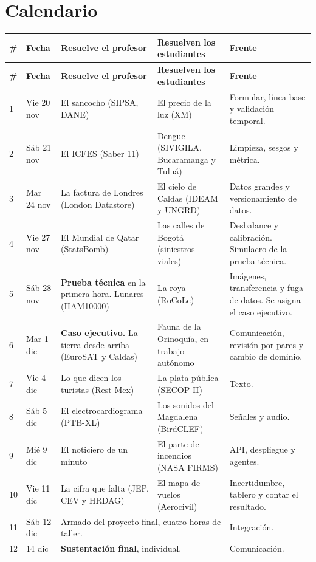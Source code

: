 \documentclass[12pt,letterpaper]{article}
\begin{document}
\section{Calendario}
\begin{longtable}{p{0.5cm}p{1.6cm}p{4.1cm}p{4.1cm}p{3.9cm}}
\toprule
\textbf{\#} & \textbf{Fecha} & \textbf{Resuelve el profesor} & \textbf{Resuelven los estudiantes} & \textbf{Frente}\\
\midrule
\endfirsthead
\toprule
\textbf{\#} & \textbf{Fecha} & \textbf{Resuelve el profesor} & \textbf{Resuelven los estudiantes} & \textbf{Frente}\\
\midrule
\endhead
1 & Vie 20 nov & El sancocho (SIPSA, DANE) & El precio de la luz (XM) & Formular, línea base y validación temporal.\\
2 & Sáb 21 nov & El ICFES (Saber 11) & Dengue (SIVIGILA, Bucaramanga y Tuluá) & Limpieza, sesgos y métrica.\\
3 & Mar 24 nov & La factura de Londres (London Datastore) & El cielo de Caldas (IDEAM y UNGRD) & Datos grandes y versionamiento de datos.\\
4 & Vie 27 nov & El Mundial de Qatar (StatsBomb) & Las calles de Bogotá (siniestros viales) & Desbalance y calibración. Simulacro de la prueba técnica.\\
5 & Sáb 28 nov & \textbf{Prueba técnica} en la primera hora. Lunares (HAM10000) & La roya (RoCoLe) & Imágenes, transferencia y fuga de datos. Se asigna el caso ejecutivo.\\
6 & Mar 1 dic & \textbf{Caso ejecutivo.} La tierra desde arriba (EuroSAT y Caldas) & Fauna de la Orinoquía, en trabajo autónomo & Comunicación, revisión por pares y cambio de dominio.\\
7 & Vie 4 dic & Lo que dicen los turistas (Rest-Mex) & La plata pública (SECOP II) & Texto.\\
8 & Sáb 5 dic & El electrocardiograma (PTB-XL) & Los sonidos del Magdalena (BirdCLEF) & Señales y audio.\\
9 & Mié 9 dic & El noticiero de un minuto & El parte de incendios (NASA FIRMS) & API, despliegue y agentes.\\
10 & Vie 11 dic & La cifra que falta (JEP, CEV y HRDAG) & El mapa de vuelos (Aerocivil) & Incertidumbre, tablero y contar el resultado.\\
11 & Sáb 12 dic & \multicolumn{2}{p{8.2cm}}{Armado del proyecto final, cuatro horas de taller.} & Integración.\\
12 & 14 dic & \multicolumn{2}{p{8.2cm}}{\textbf{Sustentación final}, individual.} & Comunicación.\\
\bottomrule
\end{longtable}
\end{document}
